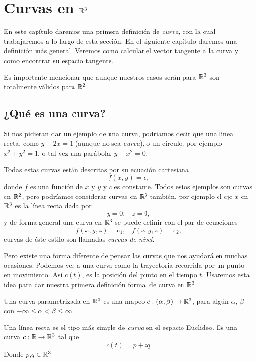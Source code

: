 \chapter{Curvas en $\mathbb{R}^{3}$}\label{ch:curvas-en-r3}

En este capítulo daremos una primera definición de \emph{curva}, con la cual trabajaremos
a lo largo de esta sección. En el siguiente capítulo daremos una definición más general.
Veremos como calcular el vector tangente a la curva y como encontrar su espacio tangente.

Es importante mencionar que aunque nuestros casos serán para $\mathbb{R}^{3}$ son totalmente
válidos para $\mathbb{R}^{2}$.

\section{¿Qu\'e es una curva?}

Si nos pidieran dar un ejemplo de una curva, podriamos decir que una l\'inea recta, como
$y-2x=1$ (aunque no sea \emph{curva}), o un c\'irculo, por ejemplo $x^{2} + y^{2} = 1$, 
o tal vez una par\'abola, $y-x^{2}=0$.

Todas estas curvas est\'an descritas por su ecuaci\'on cartesiana
$$ f(x,y) = c \text{,} $$
donde $f$ es una funci\'on de $x$ y $y$ y $c$ es constante. Todos estos ejemplos son curvas
en $\mathbb{R}^{2}$, pero podr\'iamos considerar curvas en $\mathbb{R}^{3}$ tambi\'en, por ejemplo
el eje $x$ en $\mathbb{R}^{3}$ es la l\'inea recta dada por
$$y=0\text{,} \quad z=0 \text{,}$$
y de forma general una curva en $\mathbb{R}^{3}$ se puede definir con el par de ecuaciones
$$ f(x,y,z)=c_{1}\text{,}\quad f(x,y,z)=c_{2} \text{,}$$
curvas de \'este estilo son llamadas \emph{curvas de nivel}.

Pero existe una forma diferente de pensar las curvas que nos ayudar\'a en muchas ocasiones.
Podemos ver a una curva como la trayectoria recorrida por un punto en movimiento. As\'i
$c(t)$, es la posici\'on del punto en el tiempo $t$. Usaremos esta idea para dar nuestra
primera definici\'on formal de curva en $\mathbb{R}^{3}$

\begin{definition}
    Una curva parametrizada en $\mathbb{R}^{3}$ es una mapeo $c:(\alpha,\beta) \rightarrow \mathbb{R}^{3}$,
    para alg\'un $\alpha$, $\beta$ con $-\infty \le \alpha < \beta \le \infty$.
\end{definition}

\begin{myExample}
    Una línea recta es el tipo más simple de \emph{curva} en el espacio Euclideo. Es una curva
    $c:\mathbb{R} \rightarrow \mathbb{R}^{3}$ tal que
    $$ c(t) = p + tq$$
    Donde $p$,$q$ $\in \mathbb{R}^{3}$
\end{myExample}

